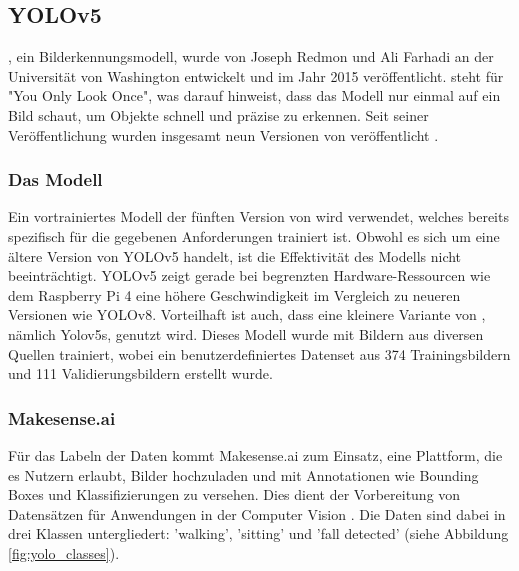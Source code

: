 \subsection{YOLOv5}
, ein Bilderkennungsmodell, wurde von Joseph Redmon und Ali Farhadi an der Universität von Washington entwickelt und im Jahr 2015 veröffentlicht.  steht für "You Only Look Once", was darauf hinweist, dass das Modell nur einmal auf ein Bild schaut, um Objekte schnell und präzise zu erkennen. Seit seiner Veröffentlichung wurden insgesamt neun Versionen von  veröffentlicht \cite{Yolo} .

\subsubsection{Das Modell}
Ein vortrainiertes Modell der fünften Version von  wird verwendet, welches bereits spezifisch für die gegebenen Anforderungen trainiert ist. Obwohl es sich um eine ältere Version von YOLOv5 handelt, ist die Effektivität des Modells nicht beeinträchtigt. YOLOv5 zeigt gerade bei begrenzten Hardware-Ressourcen wie dem Raspberry Pi 4 eine höhere Geschwindigkeit im Vergleich zu neueren Versionen wie YOLOv8. Vorteilhaft ist auch, dass eine kleinere Variante von , nämlich Yolov5s, genutzt wird. Dieses Modell wurde mit Bildern aus diversen Quellen trainiert, wobei ein benutzerdefiniertes Datenset aus 374 Trainingsbildern und 111 Validierungsbildern erstellt wurde.

\subsubsection{Makesense.ai}
Für das Labeln der Daten kommt Makesense.ai zum Einsatz, eine Plattform, die es Nutzern erlaubt, Bilder hochzuladen und mit Annotationen wie Bounding Boxes und Klassifizierungen zu versehen. Dies dient der Vorbereitung von Datensätzen für Anwendungen in der Computer Vision \cite{noauthor_make_nodate}. Die Daten sind dabei in drei Klassen untergliedert: 'walking', 'sitting' und 'fall detected' (siehe Abbildung \ref{fig:yolo_classes}).


